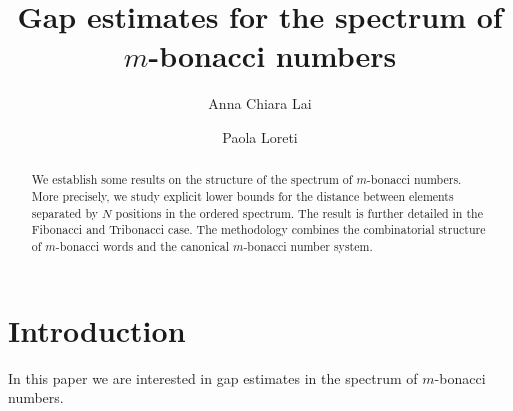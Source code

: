 \documentclass{amsart}
\title[Gap estimates for the spectrum of the $m$-bonacci numbers]{Gap estimates for the spectrum of $m$-bonacci numbers}
\author{Anna Chiara Lai}
\author{Paola Loreti}
\begin{document}
\begin{abstract}
We establish some results on the structure of the spectrum of $m$-bonacci numbers. More precisely, we study explicit lower bounds for the distance between elements separated by $N$ positions in the ordered spectrum. The result is further detailed in the Fibonacci and Tribonacci case. The methodology combines the combinatorial structure of $m$-bonacci words and the canonical $m$-bonacci number system.
\end{abstract}

\maketitle

\section{Introduction}
In this paper we are interested in gap estimates in the spectrum of $m$-bonacci numbers. 
\end{document}
